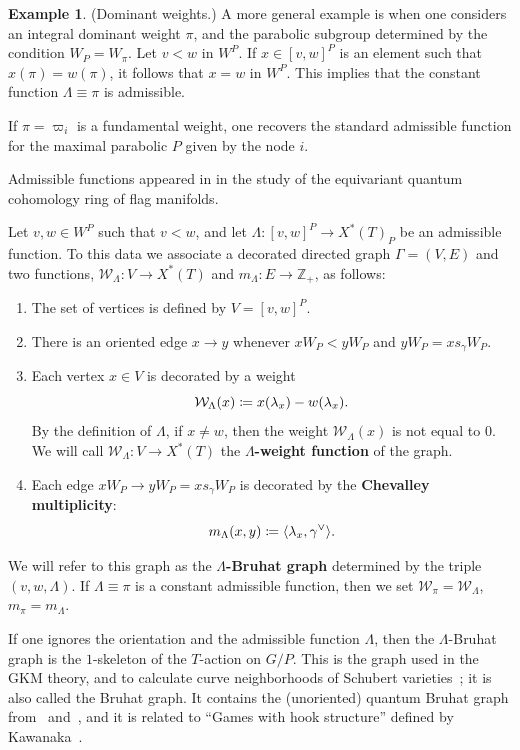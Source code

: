 \documentclass[11pt]{article}
\theoremstyle{definition}
\newtheorem{example}[theo]{Example}
\numberwithin{equation}{section}
\begin{document}
\begin{example}	
	(Dominant weights.) A more general example is when 
	one considers an integral dominant weight $\pi$, and the 
	parabolic subgroup determined by the condition $W_P = W_\pi$. 
	Let $v < w$ in $W^P$. If $x \in [v,w]^P$ is an element such that 
	$x(\pi) = w(\pi)$, it follows that $x=w$ in $W^P$. This implies that the constant function 
	$\Lambda \equiv \pi$ is admissible. 		
	
	If $\pi= \varpi_i$ is a fundamental weight, one recovers the standard admissible function for the maximal parabolic $P$ given by the node $i$.
\end{example}
Admissible functions appeared in 
\cite[\S 7]{mihalcea:eqqhom} in the study of the equivariant quantum 
cohomology ring of flag manifolds.

\begin{defin}\label{def:ref_di} Let $v,w \in W^P$ such that $v <w$, and let \mbox{$\Lambda: [v,w]^P \to X^*(T)_P$} be an admissible function. 
To this data we associate a decorated directed graph $\Gamma=(V,E)$ and two functions, 
$\mathcal{W}_\Lambda: V \to {X^*(T)}$
and $m_\Lambda: E \to \mathbb{Z}_+$, 
as follows:
\begin{enumerate} \item The set of vertices is defined by $V=[v,w]^P$.
\item There is an oriented edge $x{\to} y$ whenever 
$xW_P < yW_P$ and
$yW_P=x s_\gamma W_P$.
\item Each vertex $x \in V$ is decorated by a weight
\[ \mathcal{W}_\Lambda(x) \coloneqq  x(\lambda_x) - w(\lambda_x) \/. \]  
By the definition of $\Lambda$, if $x \neq w$, then the weight $\mathcal{W}_\Lambda(x)$ is not equal to $0$.
We will call $\mathcal{W}_\Lambda: V \to X^*(T)$ the 
{\bf $\Lambda$-weight function} of the graph.
\item Each edge $xW_P {\to} y W_P=x s_\gamma W_P$ is decorated by the 
{\bf Chevalley multiplicity}: 
\[ m_\Lambda(x,y) \coloneqq  \langle \lambda_x, \gamma^\vee \rangle \/. \]
\end{enumerate}
We will refer to this graph as the {\bf $\Lambda$-Bruhat graph} determined by the triple $(v,w,\Lambda)$.
If $\Lambda \equiv \pi$ is a constant admissible function, then we set 
$\mathcal{W}_\pi = \mathcal{W}_\Lambda$, $m_\pi = m_\Lambda$.  
\end{defin}
If one ignores the orientation and the admissible function $\Lambda$, then the $\Lambda$-Bruhat graph is the 
$1$-skeleton of the $T$-action on $G/P$. This is the graph used in the GKM theory, and to calculate curve neighborhoods of 
Schubert varieties~\cite{buch.m:nbhds}; it is also called the Bruhat graph. 
It contains the (unoriented) quantum 
Bruhat graph from~\cite{BFP99} and~\cite{LNSSS}, and it is related to 
``Games with hook structure'' defined by Kawanaka~\cite{Kaw15}.
\end{document}
